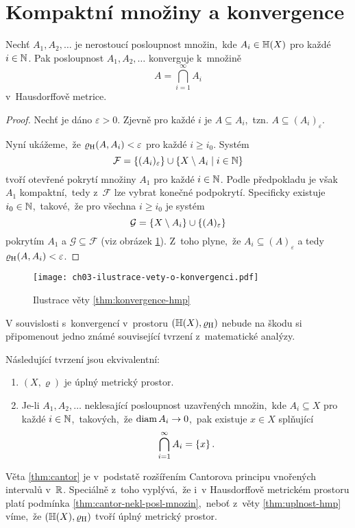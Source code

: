 \section{Kompaktní množiny a konvergence}\label{sec:konvergence-hmp}

\begin{theorem}\label{thm:konvergence-hmp}
    Nechť $A_1,A_2,\ldots$ je nerostoucí posloupnost množin,~kde $A_i\in\mathbb{H}(X)$ pro každé $i\in\mathbb{N}$. Pak posloupnost $A_1,A_2,\ldots$ konverguje k~množině
    \[A=\bigcap_{i=1}^\infty A_i\]
    v~Hausdorffově metrice.
\end{theorem}
\begin{proof}
    Nechť je dáno $\varepsilon>0$. Zjevně pro každé $i$ je $A\subseteq A_i$,~tzn. $A\subseteq(A_i)_\varepsilon$.
    
    Nyní ukážeme,~že $\varrho_\textup{H}(A,A_i)<\varepsilon$ pro každé $i\geqslant i_0$. Systém
    \[\mathcal{F}=\left\{(A_i)_\varepsilon\right\}\cup\left\{X\setminus A_i\mid i\in\mathbb{N}\right\}\]
    tvoří otevřené pokrytí množiny $A_1$ pro každé $i\in\mathbb{N}$. Podle předpokladu je však $A_1$ kompaktní,~tedy z~$\mathcal{F}$ lze vybrat konečné podpokrytí. Specificky existuje $i_0\in\mathbb{N}$,~takové,~že pro všechna $i\geqslant i_0$ je systém
    \[\mathcal{G}=\left\{X\setminus A_i\right\}\cup\left\{(A)_\varepsilon\right\}\]
    pokrytím $A_1$ a $\mathcal{G}\subseteq\mathcal{F}$ (viz obrázek \ref{fig:konvergence-hmp}). Z~toho plyne,~že $A_i\subseteq (A)_\varepsilon$ a tedy $\varrho_\textup{H}(A,A_i)<\varepsilon$.
\end{proof}
\begin{figure}[h]
    \centering
    \texttt{[image: ch03-ilustrace-vety-o-konvergenci.pdf]}
    \caption{Ilustrace věty \ref{thm:konvergence-hmp}}
    \label{fig:konvergence-hmp}
\end{figure}

V souvislosti s~konvergencí v~prostoru $(\mathbb{H}(X),\varrho_\textup{H})$ nebude na škodu si připomenout jedno známé související tvrzení z~matematické analýzy.
\begin{theorem}\label{thm:cantor}
    Následující tvrzení jsou ekvivalentní:
    \begin{enumerate}[label=(\roman*)]
        \item\label{thm:cantor-uplnost} $(X,\varrho)$ je úplný metrický prostor.
        \item\label{thm:cantor-nekl-posl-mnozin} Je-li $A_1,A_2,\ldots$ neklesající posloupnost uzavřených množin,~kde $A_i\subseteq X$ pro každé $i\in\mathbb{N}$,~takových,~že $\operatorname{diam}{A_i}\to 0$,~pak existuje $x\in X$ splňující
        \[\bigcap_{i=1}^\infty A_i=\left\{x\right\}.\]
    \end{enumerate}
\end{theorem}
Věta \ref{thm:cantor} je v~podstatě rozšířením Cantorova principu vnořených intervalů v~$\mathbb{R}$. Speciálně z~toho vyplývá,~že i~v Hausdorffově metrickém prostoru platí podmínka \ref{thm:cantor-nekl-posl-mnozin},~neboť z~věty \ref{thm:uplnost-hmp} víme,~že $(\mathbb{H}(X),\varrho_\textup{H})$ tvoří úplný metrický prostor.

